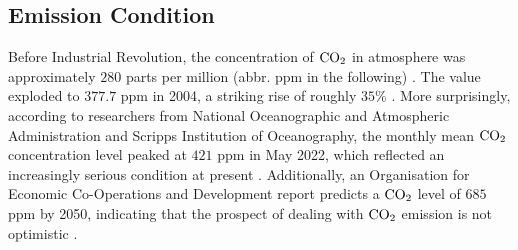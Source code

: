 \documentclass[12pt,a4paper]{article}
\begin{document}
    \subsection{Emission Condition}
    
    Before Industrial Revolution, the concentration of $\ce{CO2}$ in atmosphere was approximately $280$ parts per million (abbr. ppm in the following) \citep{neftel_evidence_1985}. The value exploded to $377.7$ ppm in 2004, a striking rise of roughly $35\%$ \citep{dr_pieter_tans_trends_2022}. More surprisingly, according to researchers from National Oceanographic and Atmospheric Administration and Scripps Institution of Oceanography, the monthly mean $\ce{CO2}$ concentration level peaked at $421$ ppm in May 2022, which reflected an increasingly serious condition at present \citep{national_oceanographic_and_atmospheric_administration_carbon_2022}. Additionally, an Organisation for Economic Co-Operations and Development report predicts a $\ce{CO2}$ level of $685$ ppm by 2050, indicating that the prospect of dealing with $\ce{CO2}$ emission is not optimistic \citep{organisation_for_economic_co-operations_and_development_oecd_2012}.
\end{document}

